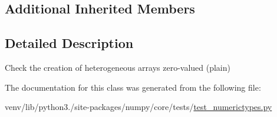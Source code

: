 \subsection*{Additional Inherited Members}


\subsection{Detailed Description}
\begin{DoxyVerb}Check the creation of heterogeneous arrays zero-valued (plain)\end{DoxyVerb}
 

The documentation for this class was generated from the following file\+:\begin{DoxyCompactItemize}
\item 
venv/lib/python3./site-\/packages/numpy/core/tests/\hyperlink{test__numerictypes_8py}{test\+\_\+numerictypes.\+py}\end{DoxyCompactItemize}
